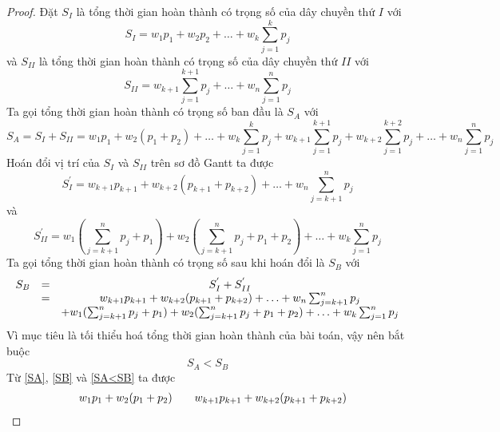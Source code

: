 \documentclass[12pt,a4paper]{report}
\begin{document}
\begin{proof}
	Đặt $S_I$ là tổng thời gian hoàn thành có trọng số của dây chuyền thứ $I$ với
	\begin{equation}
		S_I = w_1 p_1 + w_2 p_2 + \ldots + w_k \sum_{j=1}^k p_j
	\end{equation}
	và $S_{II}$ là tổng thời gian hoàn thành có trọng số của dây chuyền thứ $II$ với
	\begin{equation}
		S_{II} = w_{k+1} \sum_{j=1}^{k+1} p_j + \ldots + w_n \sum_{j=1}^{n} p_j
	\end{equation}
	Ta gọi tổng thời gian hoàn thành có trọng số ban đầu là $S_A$ với
	\begin{equation} \label{SA}
		S_A = S_I + S_{II} = w_1 p_1 + w_2 (p_1 + p_2) + \ldots + w_k \sum_{j=1}^k p_j + w_{k+1} \sum_{j=1}^{k+1} p_j + w_{k+2} \sum_{j=1}^{k+2} p_j + \ldots + w_n \sum_{j=1}^{n} p_j
	\end{equation}
	Hoán đổi vị trí của $S_I$ và $S_{II}$ trên sơ đồ Gantt ta được
	\begin{equation}
		S_I^{'} = w_{k+1} p_{k+1} + w_{k+2}(p_{k+1} + p_{k+2}) + \ldots + w_n \sum_{j=k+1}^{n} p_j
	\end{equation}
	và
	\begin{equation}
		S_{II}^{'} = w_1(\sum_{j=k+1}^{n}p_j+p_1) + w_2(\sum_{j=k+1}^{n}p_j+p_1+p_2) + \ldots + w_k\sum_{j=1}^{n} p_j
	\end{equation}
	Ta gọi tổng thời gian hoàn thành có trọng số sau khi hoán đổi là $S_B$ với
	\begin{equation} \label{SB}
		\begin{array}{c c c}
		S_B &=& S_I^{'} + S_{II}^{'} \\
		&=& w_{k+1} p_{k+1} + w_{k+2}(p_{k+1} + p_{k+2}) + \ldots + w_n \sum_{j=k+1}^{n} p_j \\
		&& + w_1(\sum_{j=k+1}^{n}p_j+p_1) + w_2(\sum_{j=k+1}^{n}p_j+p_1+p_2) + \ldots + w_k\sum_{j=1}^{n} p_j
		\end{array}
	\end{equation}
	Vì mục tiêu là tối thiểu hoá tổng thời gian hoàn thành của bài toán, vậy nên bắt buộc
	\begin{equation} \label{SA<SB}
		S_A < S_B
	\end{equation}
	Từ \eqref{SA}, \eqref{SB} và \eqref{SA<SB} ta được
	\begin{equation*}
	\begin{array}{c c c c}
	& w_1 p_1 + w_2 (p_1 + p_2)  && w_{k+1} p_{k+1} + w_{k+2}(p_{k+1} + p_{k+2}) \\


\end{array}
\end{equation*}
\end{proof}
\end{document}

